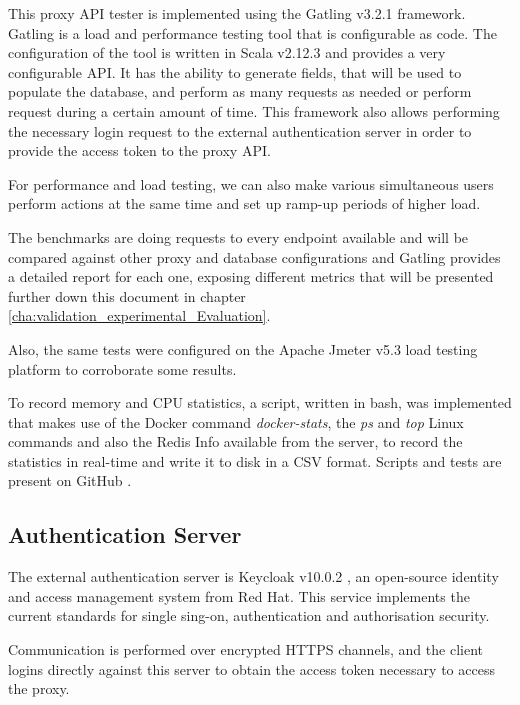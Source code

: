 This proxy \gls{API} tester is implemented using the Gatling v3.2.1 \cite{gatling:1} framework. Gatling is a load and performance testing tool that is configurable as code. The configuration of the tool is written in Scala v2.12.3 and provides a very configurable \gls{API}. It has the ability to generate fields, that will be used to populate the database, and perform as many requests as needed or perform request during a certain amount of time. This framework also allows performing the necessary login request to the external authentication server in order to provide the access token to the proxy API.

For performance and load testing, we can also make various simultaneous users perform actions at the same time and set up ramp-up periods of higher load.

The benchmarks are doing requests to every endpoint available and will be compared against other proxy and database configurations and Gatling provides a detailed report for each one, exposing different metrics that will be presented further down this document in chapter \ref{cha:validation_experimental_Evaluation}.

Also, the same tests were configured on the Apache Jmeter v5.3\cite{jmeter:1} load testing platform to corroborate some results.

To record memory and \gls{CPU} statistics, a script, written in bash, was implemented that makes use of the Docker command \textit{docker-stats}, the \textit{ps} and \textit{top} Linux commands and also the Redis Info available from the server, to record the statistics in real-time and write it to disk in a \gls{CSV} format. Scripts and tests are present on GitHub \cite{thesis-repository:client}.

\subsection{Authentication Server}
\label{ssec:implementation_authentication_server}

The external authentication server is Keycloak v10.0.2 \cite{keycloak:1}, an open-source identity and access management system from Red Hat. This service implements the current standards for single sing-on, authentication and authorisation security.

Communication is performed over encrypted \gls{HTTPS} channels, and the client logins directly against this server to obtain the access token necessary to access the proxy.

